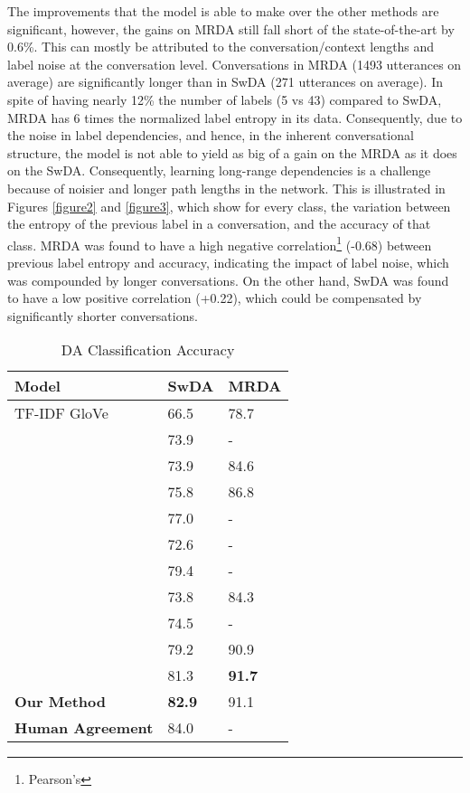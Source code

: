 \documentclass[11pt,a4paper]{article}
\begin{document}
The improvements that the model is able to make over the other methods are significant, however, the gains on MRDA still fall short of the state-of-the-art by 0.6\%. This can mostly be attributed to the conversation/context lengths and label noise at the conversation level. Conversations in MRDA (1493 utterances on average) are significantly longer than in SwDA  (271  utterances on average). In spite of having nearly 12\% the number of labels (5 vs 43) compared to SwDA, MRDA has 6 times the normalized label entropy in its data. Consequently, due to the noise in label dependencies, and hence, in the inherent conversational structure, the model is not able to yield as big of a gain on the MRDA as it does on the SwDA. Consequently, learning long-range dependencies is a challenge because of noisier and longer path lengths in the network. This is illustrated in Figures \ref{figure2} and \ref{figure3}, which show for every class, the variation between the entropy of the previous label in a conversation, and the accuracy of that class. MRDA was found to have a high negative correlation{\footnote{Pearson's }} (-0.68) between previous label entropy and accuracy, indicating the impact of label noise, which was compounded by longer conversations. On the other hand, SwDA was found to have a low positive correlation (+0.22), which could be compensated by significantly shorter conversations. 


\begin{table}[t!]
\begin{center}
\small
\begin{tabular}{lll}
\hline \bf Model & \bf SwDA & \bf MRDA\\ \hline
TF-IDF GloVe & 66.5 & 78.7 \\
\citet{kalchbrenner2013recurrent} & 73.9  & - \\
\citet{lee2016sequential} & 73.9 & 84.6 \\
\citet{khanpour2016dialogue} & 75.8 & 86.8 \\
\citet{ji2016latent} & 77.0 & - \\
\citet{shen2016neural} & 72.6 & - \\
\citet{li2016multi} & 79.4 & - \\
\citet{ortega2017neural} & 73.8 & 84.3 \\ 
\citet{tran2017hierarchical} & 74.5 & - \\
\citet{AAAI1816706} & 79.2 & 90.9 \\
\citet{chen2017dialogue} & 81.3 & \bf 91.7 \\ \hline
\bf Our Method & \bf 82.9 & 91.1 \\ \hline
\bf Human Agreement & 84.0 & - \\
\hline
\end{tabular}
\end{center}
\caption{\label{da-classification-results}  DA Classification Accuracy}
\vspace{-0.2cm}
\end{table}
\end{document}
